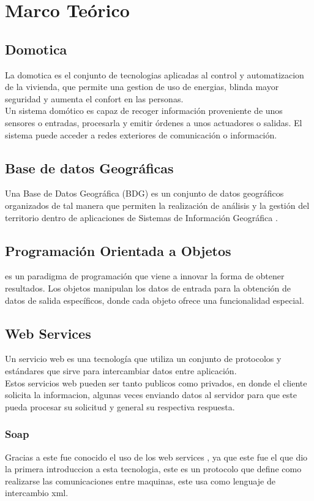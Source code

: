 \section{Marco Teórico}

\subsection{Domotica}
La domotica es el conjunto de tecnologias aplicadas al control y automatizacion  de la vivienda, que permite una gestion de uso de energias, blinda mayor seguridad y aumenta el confort en las personas.\\
Un sistema domótico es capaz de recoger información proveniente de unos sensores o entradas, procesarla y emitir órdenes a unos actuadores o salidas. El sistema puede acceder a redes exteriores de comunicación o información.\\
\subsection{Base de datos Geográficas}
Una Base de Datos Geográfica (BDG) es un conjunto de datos geográficos organizados de tal manera que permiten la realización de análisis y la gestión del territorio dentro de aplicaciones de Sistemas de Información Geográfica .\\
\subsection{Programación Orientada a Objetos}
 es un paradigma de programación que viene a innovar la forma de obtener resultados. Los objetos manipulan los datos de entrada para la obtención de datos de salida específicos, donde cada objeto ofrece una funcionalidad especial.\\
\subsection{Web Services}
Un servicio web es una tecnología que utiliza un conjunto de protocolos y estándares que sirve para intercambiar datos entre aplicación.\\
Estos servicios web pueden ser tanto publicos como privados, en donde el cliente solicita la informacion, algunas veces enviando datos al servidor para que este pueda procesar su solicitud y general su respectiva respuesta.
\subsubsection{Soap}
Gracias a este fue conocido el uso de los web services , ya que este fue el que dio la primera introduccion a esta tecnologia, este es un protocolo que define como realizarse las comunicaciones entre maquinas, este usa como lenguaje de intercambio xml.
